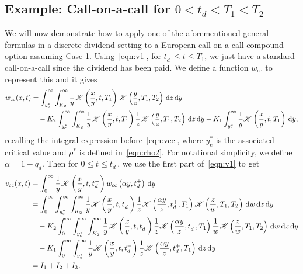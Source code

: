 \subsection{Example: Call-on-a-call for $0 < t_d < T_1 < T_2$}
We will now demonstrate how to apply one of the aforementioned general formulas in a discrete dividend setting to a European call-on-a-call compound option assuming Case 1. Using~\eqref{eqn:v1}, for $t_d^+ \leq t \leq T_1$, we just have a standard call-on-a-call since the dividend has been paid. We define a function $w_\text{cc}$ to represent this and it gives
	\begin{equation*}
		\begin{split}
		w_\text{cc}(x,t) &=  \int_{y_\mathrm{c}^*}^\infty \int_{K_2}^\infty \frac{1}{y}\mathscr K\left( \frac{x}{y}, t, T_1 \right)\mathscr K\left( \frac{y}{z}, T_1, T_2 \right) \, \mathrm d z \, \mathrm d y \\
		& \quad - K_2 \int_{y_\mathrm{c}^*}^\infty \int_{K_2}^\infty \frac{1}{y}\mathscr K\left( \frac{x}{y}, t, T_1 \right)\frac{1}{z}\mathscr K\left( \frac{y}{z}, T_1, T_2 \right) \, \mathrm d z \, \mathrm d y - K_1\int_{y_\mathrm{c}^*}^\infty \frac{1}{y}\mathscr K\left( \frac{x}{y}, t, T_1 \right) \, \mathrm d y,
	\end{split}
	\end{equation*}
recalling the integral expression before~\eqref{eqn:vcc}, where $y_\mathrm{c}^*$ is the associated critical value and $\rho^*$ is defined in~\eqref{eqn:rho2}. For notational simplicity, we define $\alpha = 1-q_d$. Then for $0 \leq t \leq t_d^-$, we use the first part of~\eqref{eqn:v1} to get
		\begin{equation*}
			\begin{split}
				v_\text{cc}(x,t) &= \int_0^\infty \frac{1}{y}\mathscr K\left( \frac{x}{y}, t, t_d^- \right)w_\text{cc}\left( \alpha y, t_d^+ \right) \, \mathrm d y \\
				&= \int_0^\infty \int_{y_\mathrm{c}^*}^\infty \int_{K_2}^\infty \frac{1}{y}\mathscr K\left( \frac{x}{y}, t, t_d^- \right) \frac{1}{z}\mathscr K\left( \frac{\alpha y}{z}, t_d^+, T_1 \right)\mathscr K\left( \frac{z}{w}, T_1, T_2 \right) \, \mathrm d w \, \mathrm d z \, \mathrm d y \\
				&\quad - K_2\int_0^\infty \int_{y_\mathrm{c}^*}^\infty \int_{K_2}^\infty \frac{1}{y}\mathscr K\left( \frac{x}{y}, t, t_d^- \right) \frac{1}{z}\mathscr K\left( \frac{\alpha y}{z}, t_d^+, T_1 \right)\frac{1}{w}\mathscr K\left( \frac{z}{w}, T_1, T_2 \right) \, \mathrm d w \, \mathrm d z \, \mathrm d y \\
				&\quad - K_1\int_0^\infty \int_{y_\mathrm{c}^*}^\infty \frac{1}{y}\mathscr K\left( \frac{x}{y}, t, t_d^- \right) \frac{1}{z}\mathscr K\left( \frac{\alpha y}{z}, t_d^+, T_1 \right) \, \mathrm d z \, \mathrm d y \\
				&= I_1 + I_2 + I_3.
			\end{split}
		\end{equation*}
